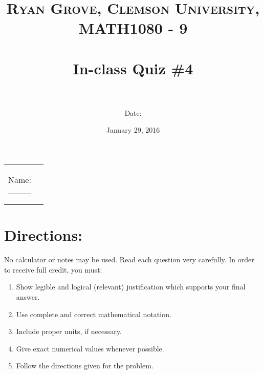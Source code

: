 \documentclass[paper=a4, fontsize=11pt]{scrartcl} %
\title{	
\normalfont \normalsize 
\textsc{Ryan Grove, Clemson University, MATH1080 - 9} \\ [25pt] %
\horrule{0.5pt} \\[0.4cm] %
\huge In-class Quiz \#4 \\ %
\horrule{2pt} \\[0.5cm] %
}
\author{Date:} %
\date{\normalsize January 29, 2016} %
\numberwithin{equation}{section} %
\numberwithin{figure}{section} %
\numberwithin{table}{section} %
\begin{document}
\maketitle %

\begin{flushleft}
\begin{tabular}{l l}
Name: \rule{3.2in}{.01cm}  & {}%
\end{tabular}
\end{flushleft}


\section*{\textbf{Directions:}}

No calculator or notes may be used.  Read each question very carefully.  In order to receive full credit, you must:
\begin{enumerate}
\item Show legible and logical (relevant) justification which supports your final answer.
\item Use complete and correct mathematical notation.
\item Include proper units, if necessary.
\item Give exact numerical values whenever possible.
\item Follow the directions given for the problem.
\end{enumerate}
\vspace{.1in}

\newpage
\end{document}
